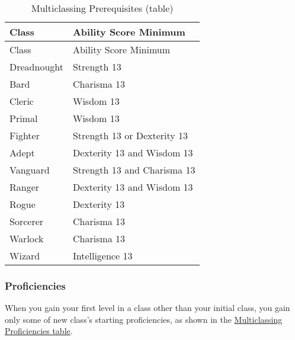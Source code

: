 \begin{longtable}[]{@{}
  >{\raggedright\arraybackslash}p{}
  >{\raggedright\arraybackslash}p{}@{}}
\caption{Multiclassing Prerequisites
(table)}\label{multiclassing-prerequisites-table}\tabularnewline
\toprule\noalign{}
\begin{minipage}[b]{\linewidth}\raggedright
Class
\end{minipage} & \begin{minipage}[b]{\linewidth}\raggedright
Ability Score Minimum
\end{minipage} \\
\midrule\noalign{}
\endfirsthead
\toprule\noalign{}
\begin{minipage}[b]{\linewidth}\raggedright
Class
\end{minipage} & \begin{minipage}[b]{\linewidth}\raggedright
Ability Score Minimum
\end{minipage} \\
\midrule\noalign{}
\endhead
\bottomrule\noalign{}
\endlastfoot
Dreadnought & Strength 13 \\
Bard & Charisma 13 \\
Cleric & Wisdom 13 \\
Primal & Wisdom 13 \\
Fighter & Strength 13 or Dexterity 13 \\
Adept & Dexterity 13 and Wisdom 13 \\
Vanguard & Strength 13 and Charisma 13 \\
Ranger & Dexterity 13 and Wisdom 13 \\
Rogue & Dexterity 13 \\
Sorcerer & Charisma 13 \\
Warlock & Charisma 13 \\
Wizard & Intelligence 13 \\
\end{longtable}

\subsubsection{Proficiencies}\label{_proficiencies_5}

When you gain your first level in a class other than your initial class,
you gain only some of new class's starting proficiencies, as shown in
the \hyperref[multiclassing-proficiencies-table]{Multiclassing
Proficiencies table}.

